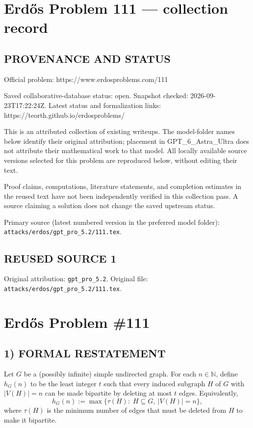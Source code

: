 \section*{Erd\H{o}s Problem 111 --- collection record}

\subsection*{PROVENANCE AND STATUS}
Official problem: https://www.erdosproblems.com/111

Saved collaborative-database status: open.
Snapshot checked: 2026-09-23T17:22:24Z.
Latest status and formalization links: https://teorth.github.io/erdosproblems/

This is an attributed collection of existing writeups. The model-folder names below identify their original attribution; placement in GPT\_6\_Astra\_Ultra does not attribute their mathematical work to that model. All locally available source versions selected for this problem are reproduced below, without editing their text.

Proof claims, computations, literature statements, and completion estimates in the reused text have not been independently verified in this collection pass. A source claiming a solution does not change the saved upstream status.

Primary source (latest numbered version in the preferred model folder): \texttt{attacks/erdos/gpt\_pro\_5.2/111.tex}.

\subsection*{REUSED SOURCE 1}
Original attribution: \texttt{gpt\_pro\_5.2}.
Original file: \texttt{attacks/erdos/gpt\_pro\_5.2/111.tex}.


\section*{Erd\H{o}s Problem \#111}

\subsection*{1) FORMAL RESTATEMENT}
Let $G$ be a (possibly infinite) simple undirected graph.  For each $n\in\mathbb N$, define $h_G(n)$ to be the least integer $t$ such that every induced subgraph $H$ of $G$ with $|V(H)|=n$ can be made bipartite by deleting at most $t$ edges.
Equivalently,
\[
 h_G(n):=\max\{\tau(H):\;H\subseteq G,\ |V(H)|=n\},
\]
where $\tau(H)$ is the minimum number of edges that must be deleted from $H$ to make it bipartite.

